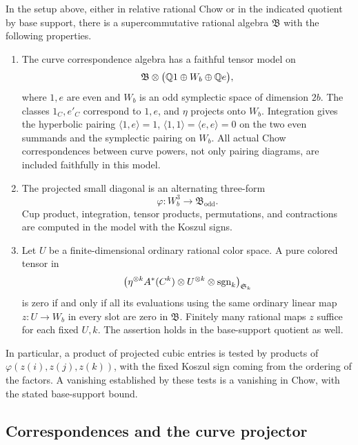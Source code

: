 \begin{proposition}
 \label{prop:tensor-test}
In the setup above, either in relative rational Chow or in the indicated
quotient by base support, there is a supercommutative rational algebra
\(\mathfrak B\) with the following properties.
\begin{enumerate}[label=\textup{(\roman*)}]
\item
The curve correspondence algebra has a faithful tensor model on
\[
 \mathfrak B\otimes
 \bigl(\mathbb Q 1\oplus W_b\oplus\mathbb Q e\bigr),
\]
where \(1,e\) are even and \(W_b\) is an odd symplectic space of dimension
\(2b\).  The classes \(1_C,e'_C\) correspond to \(1,e\), and \(\eta\)
projects onto \(W_b\).  Integration gives the hyperbolic pairing
\(\langle1,e\rangle=1\), \(\langle1,1\rangle=\langle e,e\rangle=0\)
on the two even summands and the symplectic pairing on \(W_b\).
All actual Chow correspondences between curve powers, not only pairing
diagrams, are included faithfully in this model.
\item
The projected small diagonal is an alternating three-form
\[
 \varphi\colon W_b^3\longrightarrow\mathfrak B_{\mathrm{odd}}.
\]
Cup product, integration, tensor products, permutations, and contractions
are computed in the model with the Koszul signs.
\item
Let \(U\) be a finite-dimensional ordinary rational color space.  A pure
colored tensor in
\begin{equation}
 \label{eq:colored-chow-space}
 \left(
   \eta^{\otimes k}A^*(C^k)
   \otimes U^{\otimes k}\otimes\mathrm{sgn}_k
 \right)_{\mathfrak S_k}
\end{equation}
is zero if and only if all its evaluations using the same ordinary
linear map \(z\colon U\to W_b\) in every slot are zero in \(\mathfrak B\).
Finitely many rational maps \(z\) suffice for each fixed \(U,k\).
The assertion holds in the base-support quotient as well.
\end{enumerate}
In particular, a product of projected cubic entries is tested by
products of
\(\varphi(z(i),z(j),z(k))\), with the fixed Koszul sign coming from the
ordering of the factors.  A vanishing established by these tests is a
vanishing in Chow, with the stated base-support bound.
\end{proposition}

\subsection{Correspondences and the curve projector}


